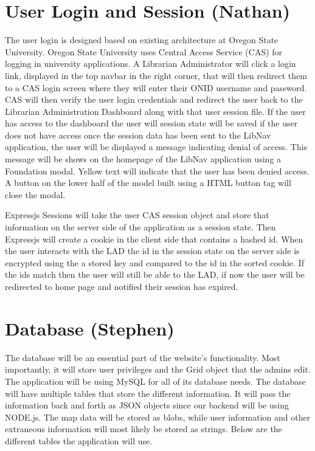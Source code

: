\documentclass[letterpaper,10pt,titlepage, onecolumn, compsoc]{IEEEtran}
\begin{document}
\section{User Login and Session (Nathan)}
The user login is designed based on existing architecture at Oregon State University.  Oregon State University uses Central Access Service (CAS) for logging in university applications. A Librarian Administrator will click a login link, displayed in the top navbar in the right corner, that will then redirect them to a CAS login screen where they will enter their ONID username and password. CAS will then verify the user login credentials and redirect the user back to the Librarian Administration Dashboard along with that user session file. If the user has access to the dashboard the user will session state will be saved if the user does not have access once the session data has been sent to the LibNav application, the user will be displayed a message indicating denial of access. This message will be shows on the homepage of the LibNav application using a Foundation modal. Yellow text will indicate that the user has been denied access. A button on the lower half of the model built using a HTML button tag  will close the modal.

Expressjs Sessions will take the user CAS session object  and store that information on the server side of the application as a session state. Then Expressjs will create a cookie in the client side that contains a hashed id. When the user interacts with the LAD the id in the session state on the server side is encrypted using the a stored key and compared to the id in the sorted cookie. If the ids match then the user will still be able to the LAD, if now the user will be redirected to home page and notified their session has expired. 

\section{Database (Stephen)}
The database will be an essential part of the website's functionality. Most importantly, it will store user privileges and the Grid object that the admins edit. The application will be using MySQL for all of its database needs. The database will have multiple tables that store the different information. It will pass the information back and forth as JSON objects since our backend will be using NODE.js. The map data will be stored as blobs, while user information and other extraneous information will most likely be stored as strings. Below are the different tables the application will use.
\end{document}
